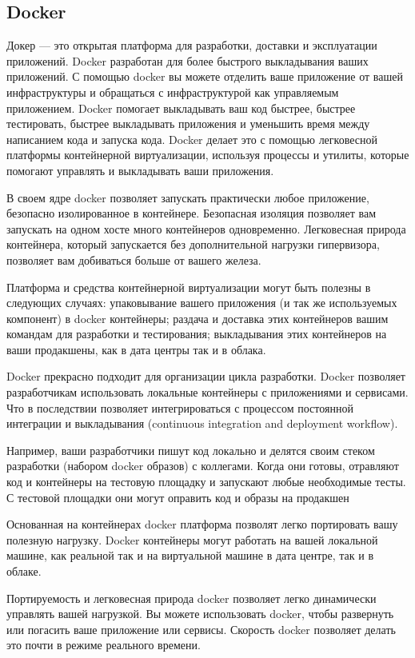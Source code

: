 \subsection{Docker}
\label{sec:analysis:docker}

Докер — это открытая платформа для разработки, доставки и эксплуатации приложений. Docker разработан для более быстрого выкладывания ваших приложений. С помощью docker вы можете отделить ваше приложение от вашей инфраструктуры и обращаться с инфраструктурой как управляемым приложением. Docker помогает выкладывать ваш код быстрее, быстрее тестировать, быстрее выкладывать приложения и уменьшить время между написанием кода и запуска кода. Docker делает это с помощью легковесной платформы контейнерной виртуализации, используя процессы и утилиты, которые помогают управлять и выкладывать ваши приложения.

В своем ядре docker позволяет запускать практически любое приложение, безопасно изолированное в контейнере. Безопасная изоляция позволяет вам 
запускать на одном хосте много контейнеров одновременно. Легковесная природа контейнера, который запускается без дополнительной нагрузки гипервизора, позволяет вам добиваться больше от вашего железа.

Платформа и средства контейнерной виртуализации могут быть полезны в следующих случаях:
упаковывание вашего приложения (и так же используемых компонент) в docker контейнеры;
раздача и доставка этих контейнеров вашим командам для разработки и тестирования;
выкладывания этих контейнеров на ваши продакшены, как в дата центры так и в облака.

Docker прекрасно подходит для организации цикла разработки. Docker позволяет разработчикам использовать локальные контейнеры с приложениями и сервисами. Что в последствии позволяет интегрироваться с процессом постоянной интеграции и выкладывания (continuous integration and deployment workflow).

Например, ваши разработчики пишут код локально и делятся своим стеком разработки (набором docker образов) с коллегами. Когда они готовы, отравляют код и контейнеры на тестовую площадку и запускают любые необходимые тесты. С тестовой площадки они могут оправить код и образы на продакшен

Основанная на контейнерах docker платформа позволят легко портировать вашу полезную нагрузку. Docker контейнеры могут работать на вашей локальной машине, как реальной так и на виртуальной машине в дата центре, так и в облаке.

Портируемость и легковесная природа docker позволяет легко динамически управлять вашей нагрузкой. Вы можете использовать docker, чтобы развернуть или погасить ваше приложение или сервисы. Скорость docker позволяет делать это почти в режиме реального времени.

